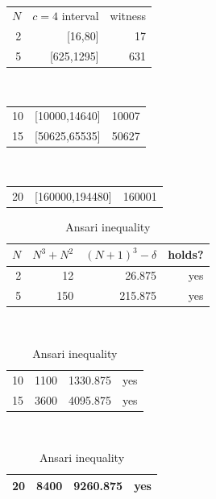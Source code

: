 \documentclass[11pt,reqno]{amsart}
\theoremstyle{blueplain}
\numberwithin{equation}{section}
\begin{document}
{\begin{table}[H]
\begin{tabular}{rrr}
	\end{tabular}
	\noindent \hspace{1em}\\[0pt]
	\noindent 
	\begin{tabular}{rrr}
		$N$ & $c=4$ interval & witness \\ 
		2 & [16,80] & 17 \\ 
		5 & [625,1295] & 631 \\ 
		
	\end{tabular}%
	\noindent \hspace{1em}\\[0pt]
	\noindent 
	\begin{tabular}{rrr}
		10 & [10000,14640] & 10007 \\ 
		15 & [50625,65535] & 50627 \\ 
		
	\end{tabular}%
	\noindent \hspace{1em}\\[0pt]
	\noindent 
	\begin{tabular}{rrr}
		20 & [160000,194480] & 160001 \\ 
		
	\end{tabular}
	
	
	
	\text{\ } \newline
	\text{\ } \vspace{0.3in}\text{\ }
\end{table}

\begin{table}[H]
	\centering
	\caption{Ansari inequality}
	\begin{tabular}{rrrr}
		\toprule $N$ & $N^3+N^2$ & $(N+1)^3-\delta$ & holds? \\ 
		\midrule 2 & 12 & 26.875 & yes \\ 
		5 & 150 & 215.875 & yes \\ 
		
	\end{tabular}%
	\noindent \hspace{1em}\\[0pt]
	\noindent 
	\begin{tabular}{rrrr}
		10 & 1100 & 1330.875 & yes \\ 
		15 & 3600 & 4095.875 & yes \\ 
		
	\end{tabular}%
	\noindent \hspace{1em}\\[0pt]
	\noindent 
	\begin{tabular}{rrrr}
		20 & 8400 & 9260.875 & yes \\ 
		\bottomrule 
	\end{tabular}
\end{table}


}
\end{document}
